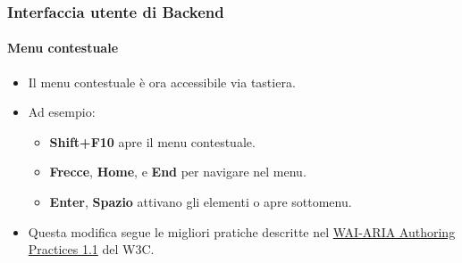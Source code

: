 %

\begin{frame}[fragile]
	\frametitle{Interfaccia utente di Backend}
	\framesubtitle{Menu contestuale}

	\begin{itemize}
		\item Il menu contestuale è ora accessibile via tastiera.
		\item Ad esempio:

			\begin{itemize}\small
				\item \textbf{Shift+F10} apre il menu contestuale.
				\item \textbf{Frecce}, \textbf{Home}, e \textbf{End} per navigare nel menu.
				\item \textbf{Enter}, \textbf{Spazio} attivano gli elementi o apre sottomenu.
			\end{itemize}

		\item Questa modifica segue le migliori pratiche descritte nel
			\href{https://www.w3.org/TR/wai-aria-practices-1.1/#keyboard-interaction-12}{WAI-ARIA Authoring Practices 1.1}
			del W3C.

	\end{itemize}

\end{frame}


